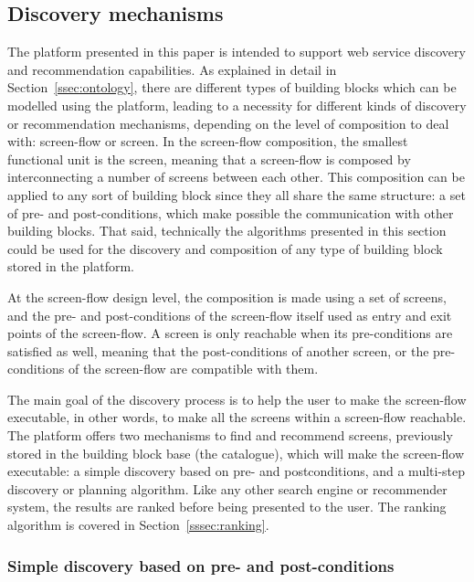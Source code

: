 
\subsection{Discovery mechanisms} %
\label{ssec:discovery}

The platform presented in this paper is intended to support web service discovery and recommendation capabilities.
As explained in detail in Section~\ref{ssec:ontology}, there are different types of building blocks which can be modelled
using the platform, leading to a necessity for different kinds of discovery or recommendation mechanisms, depending
on the level of composition to deal with: screen-flow or screen. In the screen-flow composition, the smallest
functional unit is the screen, meaning that a screen-flow is composed by interconnecting a number of screens between 
each other. This composition can be applied to any sort of building block since they all share the
same structure: a set of pre- and post-conditions, which make possible the communication with other building blocks.
That said, technically the algorithms presented in this section could be used for the discovery and composition of
any type of building block stored in the platform.

At the screen-flow design level, the composition is made using a set of screens, and the pre- and post-conditions 
of the screen-flow itself used as entry and exit points of the screen-flow. A screen is only reachable when its 
pre-conditions are satisfied as well, meaning that the post-conditions of another screen, or the pre-conditions of 
the screen-flow are compatible with them.

The main goal of the discovery process is to help the user to make the screen-flow executable, in other words, to make
all the screens within a screen-flow reachable. The platform offers two mechanisms to find and recommend
screens, previously stored in the building block base (the catalogue), which will make the screen-flow executable: a
simple discovery based on pre- and postconditions, and a multi-step discovery or planning algorithm. Like any other
search engine or recommender system, the results are ranked before being presented
to the user. The ranking algorithm is covered in Section~\ref{sssec:ranking}. 

\subsubsection{Simple discovery based on pre- and post-conditions}
\label{sssec:simple_discovery}

